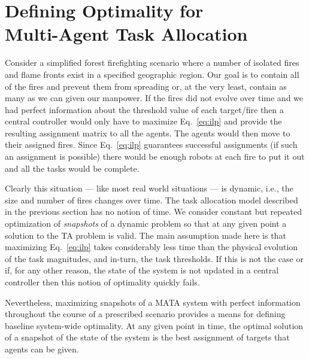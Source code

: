 \documentclass[12pt]{book}
\begin{document}
\section{Defining Optimality for\\Multi-Agent Task Allocation}\label{sec:optimaldef}
Consider a simplified forest firefighting scenario where a number of isolated fires and flame fronts exist in a specified geographic region. Our goal is to contain all of the fires and prevent them from spreading or, at the very least, contain as many as we can given our manpower. If the fires did not evolve over time and we had perfect information about the threshold value of each target/fire then a central controller would only have to maximize Eq.~\eqref{eq:ilp} and provide the resulting assignment matrix to all the agents. The agents would then move to their assigned fires. Since Eq.~\eqref{eq:ilp} guarantees successful assignments (if such an assignment is possible) there would be enough robots at each fire to put it out and all the tasks would be complete. 

Clearly this situation --- like most real world situations --- is dynamic, i.e., the size and number of fires changes over time. The task allocation model described in the previous section has no notion of time. We consider constant but repeated optimization of \textit{snapshots} of a dynamic problem so that at any given point a solution to the TA problem is valid. The main assumption made here is that maximizing Eq.~\eqref{eq:ilp} takes considerably less time than the physical evolution of the task magnitudes, and in-turn, the task thresholds. If this is not the case or if, for any other reason, the state of the system is not updated in a central controller then this notion of optimality quickly fails.

Nevertheless, maximizing snapshots of a MATA system with perfect information throughout the course of a prescribed scenario provides a means for defining baseline system-wide optimality. At any given point in time, the optimal solution of a snapshot of the state of the system is the best assignment of targets that agents can be given.

\end{document}
